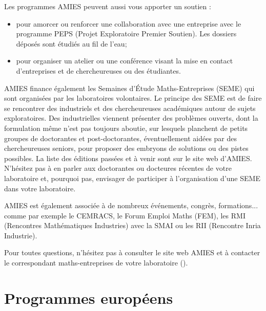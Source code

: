 Les programmes AMIES peuvent aussi vous apporter un soutien :
\begin{itemize}
\item pour amorcer ou renforcer une collaboration avec une
  entreprise avec le programme PEPS (Projet Exploratoire Premier Soutien). Les dossiers d\'epos\'es sont \'etudi\'es
  au fil de l'eau;
\item   pour organiser un atelier ou une conf\'erence visant la
  mise en contact d'entreprises et de chercheur\mp euse\mp s ou des \'etudiant\mp e\mp s.
\end{itemize}

AMIES finance \'egalement  les Semaines d'\'Etude Maths-Entreprises (SEME) qui sont
organis\'ees par les laboratoires volontaires. 
Le principe des SEME est de faire se rencontrer des industriels et des chercheur\mp euse\mp s acad{\'e}miques 
autour de sujets exploratoires. Des industriel\mp les viennent pr{\'e}senter des probl{\`e}mes ouverts, 
dont la formulation m{\^e}me n'est pas toujours aboutie, 
sur lesquels planchent de petits groupes de doctorant\mp e\mp s et post-doctorant\mp e\mp s, 
{\'e}ventuellement aid{\'e}\mp e\mp s par des chercheur\mp euse\mp s seniors, pour proposer des embryons de solutions ou des pistes possibles.
La liste des {\'e}ditions pass{\'e}es et {\`a} venir sont sur le site web d'AMIES.
N'h\'esitez pas \`a en parler aux doctorant\mp e\mp s ou docteur\mp e\mp s r\'ecent\mp e\mp s de votre laboratoire et,
pourquoi pas, envisager de participer \`a l'organisation d'une SEME dans votre laboratoire. 

AMIES est {\'e}galement associ{\'e}e {\`a} de nombreux {\'e}v{\'e}nements, congr{\`e}s, formations... 
comme par exemple le CEMRACS, le Forum Emploi Maths (FEM), les RMI (Rencontres Math{\'e}matiques Industries) 
avec la SMAI ou les RII (Rencontre Inria Industrie).

Pour toutes questions,  n'h\'esitez pas  \`a consulter le site web AMIES 
et \`a  contacter le correspondant maths-entreprises de votre laboratoire ().




\section{Programmes europ\'eens}

